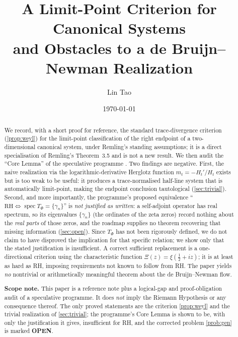 \documentclass[12pt,a4paper]{amsart}
\title[A Limit-Point Criterion and Obstacles to a dBN Realization]{A Limit-Point Criterion for Canonical Systems\\
       and Obstacles to a de Bruijn--Newman Realization}
\author{Lin Tao}
\date{\today}
\theoremstyle{plain}
\theoremstyle{definition}
\newcommand{\scopenote}[1]{\par\smallskip\noindent\textbf{Scope note.} #1\par\smallskip}
\begin{document}
\begin{abstract}
We record, with a short proof for reference, the standard trace-divergence
criterion (\cref{prop:weyl}) for the limit-point classification of the
right endpoint of a two-dimensional canonical system, under Remling's
standing assumptions; it is a direct specialisation of Remling's
Theorem~3.5 and is not a new result.
We then audit the ``Core Lemma'' of the speculative programme
\cite{SpecRoadmap}.  Two findings are negative.  First, the naive
realization via the logarithmic-derivative Herglotz function
$m_t=-H_t'/H_t$ exists but is too weak to be useful: it produces a
trace-normalised half-line system that is automatically limit-point,
making the endpoint conclusion tautological (\cref{sec:trivial}).
Second, and more importantly, the programme's proposed equivalence
``$\mathrm{RH}\iff\operatorname{spec}T_\Phi=\{\gamma_n\}$'' is \emph{not
justified as written}: a self-adjoint operator has real spectrum, so its
eigenvalues $\{\gamma_n\}$ (the ordinates of the zeta zeros) record
nothing about the \emph{real parts} of those zeros, and the roadmap
supplies no theorem recovering that missing information (\cref{sec:open}).
Since $T_\Phi$ has not been rigorously defined, we do not claim to have
disproved the implication for that specific relation; we show only that
the stated justification is insufficient.  A correct sufficient
replacement is a one-directional criterion using the characteristic
function $\Xi(z)=\xi(\tfrac12+iz)$; it is at least as hard as RH, imposing
requirements not known to follow from RH.  The paper yields \emph{no}
nontrivial or arithmetically meaningful theorem about the de Bruijn--Newman
flow.

\scopenote{This paper is a reference note plus a logical-gap and
proof-obligation audit of a speculative programme.  It does \emph{not}
imply the Riemann Hypothesis or any consequence thereof.  The only proved
statements are the criterion \cref{prop:weyl} and the trivial realization
of \cref{sec:trivial}; the programme's Core Lemma is shown to be, with
only the justification it gives, insufficient for RH, and the corrected
problem \cref{prob:gen} is marked \textbf{OPEN}.}
\end{abstract}

\maketitle

\tableofcontents

\end{document}
